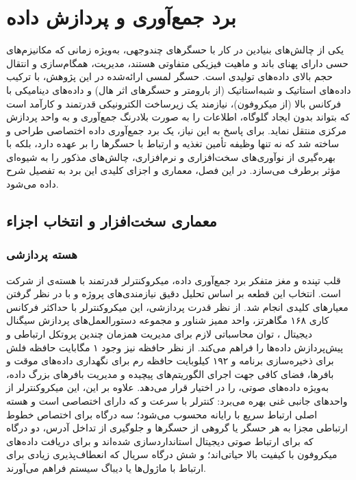 \section{برد جمع‌آوری و پردازش داده}
یکی از چالش‌های بنیادین در کار با حسگرهای چندوجهی، به‌ویژه زمانی که مکانیزم‌های حسی دارای پهنای باند و ماهیت فیزیکی متفاوتی هستند، مدیریت، همگام‌سازی و انتقال حجم بالای داده‌های تولیدی است. حسگر لمسی ارائه‌شده در این پژوهش، با ترکیب داده‌های استاتیک و شبه‌استاتیک (از بارومتر و حسگرهای اثر هال) و داده‌های دینامیکی با فرکانس بالا (از میکروفون)، نیازمند یک زیرساخت الکترونیکی قدرتمند و کارآمد است که بتواند بدون ایجاد گلوگاه، اطلاعات را به صورت بلادرنگ جمع‌آوری و به واحد پردازش مرکزی منتقل نماید. برای پاسخ به این نیاز، یک برد جمع‌آوری داده
 اختصاصی طراحی و ساخته شد که نه تنها وظیفه تأمین تغذیه و ارتباط با حسگرها را بر عهده دارد، بلکه با بهره‌گیری از نوآوری‌های سخت‌افزاری و نرم‌افزاری، چالش‌های مذکور را به شیوه‌ای مؤثر برطرف می‌سازد. در این فصل، معماری و اجزای کلیدی این برد به تفصیل شرح داده می‌شود. 

\subsection{معماری سخت‌افزار و انتخاب اجزاء} 
\subsubsection{هسته پردازشی}
قلب تپنده و مغز متفکر برد جمع‌آوری داده، میکروکنترلر قدرتمند  با هسته‌ی  از شرکت  است. انتخاب این قطعه بر اساس تحلیل دقیق نیازمندی‌های پروژه و با در نظر گرفتن معیارهای کلیدی انجام شد. از نظر قدرت پردازشی، این میکروکنترلر با حداکثر فرکانس کاری ۱۶۸ مگاهرتز، واحد ممیز شناور
 و مجموعه دستورالعمل‌های پردازش سیگنال دیجیتال
 ، توان محاسباتی لازم برای مدیریت همزمان چندین پروتکل ارتباطی و پیش‌پردازش داده‌ها را فراهم می‌کند. از نظر حافظه نیز وجود ۱ مگابایت حافظه فلش برای ذخیره‌سازی برنامه و ۱۹۲ کیلوبایت حافظه رم برای نگهداری داده‌های موقت و بافرها، فضای کافی جهت اجرای الگوریتم‌های پیچیده و مدیریت بافرهای بزرگ داده، به‌ویژه داده‌های صوتی، را در اختیار قرار می‌دهد. علاوه بر این، این میکروکنترلر از واحدهای جانبی غنی بهره می‌برد: کنترلر  با سرعت  و  که دارای  اختصاصی است و هسته اصلی ارتباط سریع با رایانه محسوب می‌شود؛ سه درگاه  برای اختصاص خطوط ارتباطی مجزا به هر حسگر یا گروهی از حسگرها و جلوگیری از تداخل آدرس، دو درگاه  که برای ارتباط صوتی دیجیتال استاندارد‌سازی شده‌اند و برای دریافت داده‌های میکروفون با کیفیت بالا حیاتی‌اند؛ و شش درگاه سریال 
 که انعطاف‌پذیری زیادی برای ارتباط با ماژول‌ها یا دیباگ سیستم فراهم می‌آورند.
